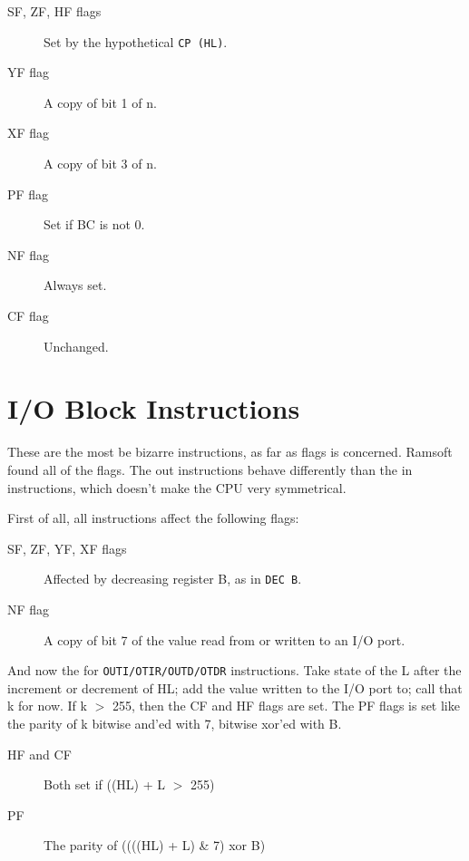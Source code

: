 \documentclass[oneside,a4paper]{book}
\begin{document}
\begin{description}

\item[SF, ZF, HF flags]
  Set by the hypothetical {\tt CP (HL)}.

\item[YF flag]
  A copy of bit 1 of n.

\item[XF flag]
  A copy of bit 3 of n.

\item[PF flag]
  Set if BC is not 0.

\item[NF flag]
  Always set.

\item[CF flag]
  Unchanged.

\end{description}

\section{I/O Block Instructions}
\label{block_io}

These are the most be bizarre instructions, as far as flags is concerned. 
Ramsoft found all of the flags. The out instructions behave differently 
than the in instructions, which doesn't make the CPU very symmetrical. 

First of all, all instructions affect the following flags:

\begin{description}

\item[SF, ZF, YF, XF flags]
  Affected by decreasing register B, as in {\tt DEC B}.

\item[NF flag]
  A copy of bit 7 of the value read from or written to an I/O port.

\end{description}

And now the for {\tt OUTI/OTIR/OUTD/OTDR} instructions. Take state of the
L after the increment or decrement of HL; add the value written to the I/O 
port to; call that k for now. If k $>$ 255, then the CF and HF flags are set. 
The PF flags is set like the parity of k bitwise and'ed with 7, bitwise 
xor'ed with B.

\begin{description}

\item[HF and CF]
  Both set if ((HL) + L  $>$ 255)

\item[PF]
  The parity of ((((HL) + L) \& 7) xor B)

\end{description}
\end{document}
